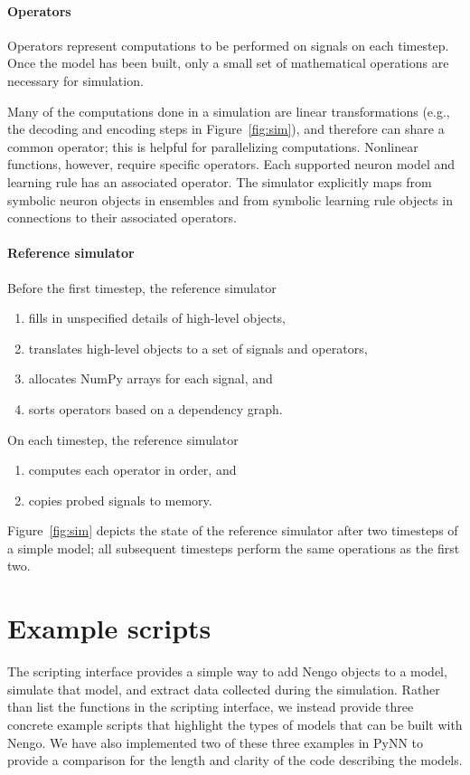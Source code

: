 \documentclass{frontiersSCNS}
\begin{document}
\paragraph{Operators}

Operators represent computations
to be performed on signals on each timestep.
Once the model has been built,
only a small set of mathematical
operations are necessary for simulation.

Many of the computations
done in a simulation
are linear transformations (e.g.,
the decoding and encoding steps
in Figure~\ref{fig:sim}),
and therefore can share a common operator;
this is helpful for parallelizing computations.
Nonlinear functions, however,
require specific operators.
Each supported neuron model and learning rule
has an associated operator.
The simulator explicitly maps
from symbolic neuron objects in ensembles
and from symbolic learning rule objects
in connections to their associated operators.

\paragraph{Reference simulator}

Before the first timestep, the reference simulator
\begin{enumerate}
  \item fills in unspecified details of high-level objects,
  \item translates high-level objects to
    a set of signals and operators,
  \item allocates NumPy arrays for each signal, and
  \item sorts operators based on a dependency graph.
\end{enumerate}
On each timestep, the reference simulator
\begin{enumerate}
  \item computes each operator in order, and
  \item copies probed signals to memory.
\end{enumerate}
Figure~\ref{fig:sim} depicts
the state of the reference simulator
after two timesteps of a simple model;
all subsequent timesteps perform the same
operations as the first two.

\section{Example scripts} \label{sec:examples}

The scripting interface provides
a simple way to add Nengo objects to a model,
simulate that model,
and extract data collected during the simulation.
Rather than list the functions in the scripting interface,
we instead provide three concrete example scripts
that highlight the types of models that can be
built with Nengo.
We have also implemented two of these three examples
in PyNN to provide a comparison
for the length and clarity of the code
describing the models.
\end{document}
